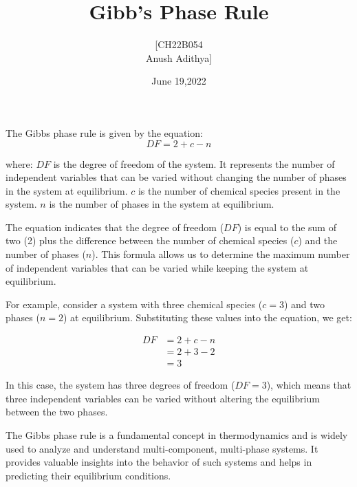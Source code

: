\documentclass{article}
\begin{document}
\author{[CH22B054 \\ Anush Adithya]}
\title{Gibb's Phase Rule}
\maketitle
\date{June 19,2022}
The Gibbs phase rule is given by the equation: 
\begin{equation}  
    DF = 2 + c - n
\end{equation}

where:
$DF$ is the degree of freedom of the system. It represents the number of independent variables that can be varied without changing the number of phases in the system at equilibrium.
$c$ is the number of chemical species present in the system.
$n$ is the number of phases in the system at equilibrium.

The equation indicates that the degree of freedom ($DF$) is equal to the sum of two (2) plus the difference between the number of chemical species ($c$) and the number of phases ($n$). This formula allows us to determine the maximum number of independent variables that can be varied while keeping the system at equilibrium.

For example, consider a system with three chemical species ($c=3$) and two phases ($n=2$) at equilibrium. Substituting these values into the equation, we get:

\begin{align*}
    DF &= 2 + c - n \\
    &= 2 + 3 - 2 \\
    &= 3
\end{align*}

In this case, the system has three degrees of freedom ($DF=3$), which means that three independent variables can be varied without altering the equilibrium between the two phases.

The Gibbs phase rule is a fundamental concept in thermodynamics and is widely used to analyze and understand multi-component, multi-phase systems. It provides valuable insights into the behavior of such systems and helps in predicting their equilibrium conditions.
\end{document}
